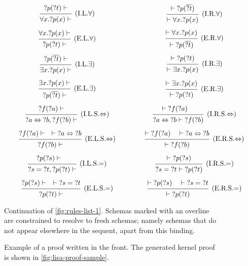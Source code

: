 \begin{figure}[H]
  $$\arraycolsep=0.75cm\def\arraystretch{3}\begin{array}{c c}
  \frule{{?p}({?t}) \vdash}{\forall x. {?p}(x) \vdash}{I.L.$\forall$} & \frule{\vdash {?p}(\overline{?t})}{\vdash \forall x. {?p}(x)}{I.R.$\forall$} \\
  \frule{\forall x. {?p}(x) \vdash}{{?p}({?t}) \vdash}{E.L.$\forall$} & \frule{\vdash \forall x. {?p}(x)}{\vdash {?p}(\overline{?t})}{E.R.$\forall$} \\
  \frule{{?p}(\overline{?t}) \vdash}{\exists x. {?p}(x) \vdash}{I.L.$\exists$} & \frule{\vdash {?p}({?t})}{\vdash \exists x. {?p}(x)}{I.R.$\exists$} \\
  \frule{\exists x. {?p}(x) \vdash}{{?p}(\overline{?t}) \vdash}{E.L.$\exists$} & \frule{\vdash \exists x. {?p}(x)}{\vdash {?p}({?t})}{E.R.$\exists$} \\
  \frule{{?f}({?a}) \vdash}{{?a} \Leftrightarrow {?b}, {?f}({?b}) \vdash}{I.L.S.$\Leftrightarrow$} & \frule{\vdash {?f}({?a}) \quad}{{?a} \Leftrightarrow {?b} \vdash {?f}({?b})}{I.R.S.$\Leftrightarrow$} \\
  \frule{{?f}({?a}) \vdash \quad \vdash {?a} \Leftrightarrow {?b}}{{?f}({?b}) \vdash}{E.L.S.$\Leftrightarrow$} & \frule{\vdash {?f}({?a}) \quad \vdash {?a} \Leftrightarrow {?b}}{\vdash {?f}({?b})}{E.R.S.$\Leftrightarrow$} \\
  \frule{{?p}({?s}) \vdash \quad}{{?s} = {?t}, {?p}({?t}) \vdash}{I.L.S.$=$} & \frule{\vdash {?p}({?s})}{{?s} = {?t} \vdash {?p}({?t})}{I.R.S.$=$} \\
  \frule{{?p}({?s}) \vdash \quad \vdash {?s} = {?t}}{{?p}({?t}) \vdash}{E.L.S.$=$} & \frule{\vdash {?p}({?s}) \quad \vdash {?s} = {?t}}{\vdash {?p}({?t})}{E.R.S.$=$}
  \end{array}$$
  \caption[Rules, continued]{Continuation of \autoref{fig:rules-list-1}. Schemas marked with an overline are constrained to resolve to fresh schemas; namely schemas that do not appear elsewhere in the sequent, apart from this binding.}
  \label{fig:rules-list-2}
\end{figure}

\begin{figure}[H]
  \centering
  
  \caption[Sample proof (front)]{Example of a proof written in the front. The generated kernel proof is shown in \autoref{fig:lisa-proof-sample}.}
  \label{fig:scala-proof-sample}
\end{figure}

